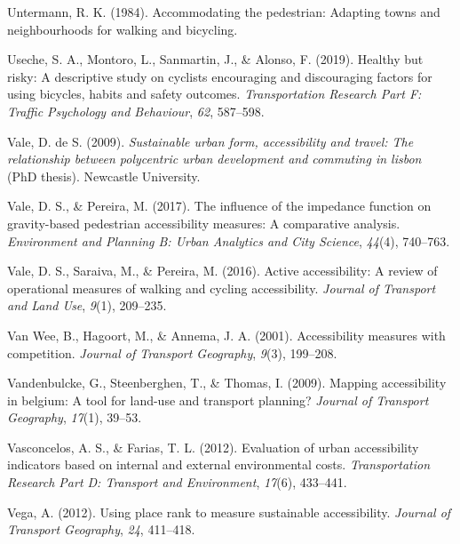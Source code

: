 \documentclass[
11pt, %
oneside, %
english, %
singlespacing, %
]{macthesis} %
\newlength{\cslhangindent}
\newenvironment{CSLReferences}[2] %
 {%
  \setlength{\parindent}{0pt}
  \ifodd #1 \everypar{\setlength{\hangindent}{\cslhangindent}}\ignorespaces\fi
  \ifnum #2 > 0
  \setlength{\parskip}{#2\baselineskip}
  \fi
 }%
 {}
\begin{document}
\begin{CSLReferences}{1}{0}
\leavevmode{}%
Untermann, R. K. (1984). Accommodating the pedestrian: Adapting towns and neighbourhoods for walking and bicycling.

\leavevmode{}%
Useche, S. A., Montoro, L., Sanmartin, J., \& Alonso, F. (2019). Healthy but risky: A descriptive study on cyclists encouraging and discouraging factors for using bicycles, habits and safety outcomes. \emph{Transportation Research Part F: Traffic Psychology and Behaviour}, \emph{62}, 587--598.

\leavevmode{}%
Vale, D. de S. (2009). \emph{Sustainable urban form, accessibility and travel: The relationship between polycentric urban development and commuting in lisbon} (PhD thesis). Newcastle University.

\leavevmode{}%
Vale, D. S., \& Pereira, M. (2017). The influence of the impedance function on gravity-based pedestrian accessibility measures: A comparative analysis. \emph{Environment and Planning B: Urban Analytics and City Science}, \emph{44}(4), 740--763.

\leavevmode{}%
Vale, D. S., Saraiva, M., \& Pereira, M. (2016). Active accessibility: A review of operational measures of walking and cycling accessibility. \emph{Journal of Transport and Land Use}, \emph{9}(1), 209--235.

\leavevmode{}%
Van Wee, B., Hagoort, M., \& Annema, J. A. (2001). Accessibility measures with competition. \emph{Journal of Transport Geography}, \emph{9}(3), 199--208.

\leavevmode{}%
Vandenbulcke, G., Steenberghen, T., \& Thomas, I. (2009). Mapping accessibility in belgium: A tool for land-use and transport planning? \emph{Journal of Transport Geography}, \emph{17}(1), 39--53.

\leavevmode{}%
Vasconcelos, A. S., \& Farias, T. L. (2012). Evaluation of urban accessibility indicators based on internal and external environmental costs. \emph{Transportation Research Part D: Transport and Environment}, \emph{17}(6), 433--441.

\leavevmode{}%
Vega, A. (2012). Using place rank to measure sustainable accessibility. \emph{Journal of Transport Geography}, \emph{24}, 411--418.


\end{CSLReferences}
\end{document}
